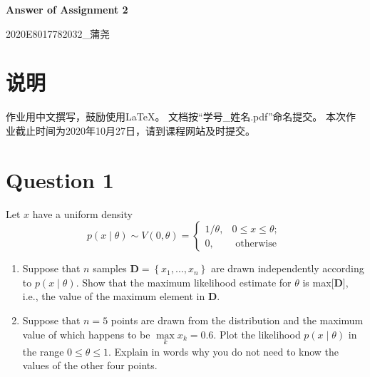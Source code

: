 \documentclass[a4paper,11pt,onecolumn,oneside,UTF8]{article}
\begin{document}
\begin{center}
    \Large\textbf{Answer of Assignment 2}
\end{center}

\begin{flushright}
    2020E8017782032\_蒲尧
\end{flushright}

\section*{说明}
\noindent 作业用中文撰写，鼓励使用LaTeX。
\newline 文档按``学号\_姓名.pdf''命名提交。
\newline 本次作业截止时间为2020年10月27日，请到课程网站及时提交。

\section*{Question 1}
Let $x$ have a uniform density
$$
    p \left(x \mid \theta \right) \sim V\left(0,\theta\right) = \left\{\begin{array}{ll}
        1/\theta, & 0 \leq x \leq \theta; \\
        0,        & \text { otherwise }
    \end{array}
    \right.
$$
\begin{enumerate}
    \item  Suppose that $n$ samples $\textbf{D} = \left \{x_1 ,...,x_n \right \}$ are
          drawn independently according to $p \left(x \mid \theta \right)$. Show that
          the maximum likelihood estimate for $\theta$ is max[\textbf{D}], i.e., the value of
          the maximum element in \textbf{D}.
    \item  Suppose that $n = 5$ points are drawn from the distribution and the maximum value
          of which happens to be $\mathop{max}\limits_{k} x_k = 0.6$. Plot the likelihood
          $p \left(x \mid \theta \right)$ in the range $0 \leq \theta \leq 1$. Explain in words
          why you do not need to know the values of the other four points.
\end{enumerate}
\end{document}
